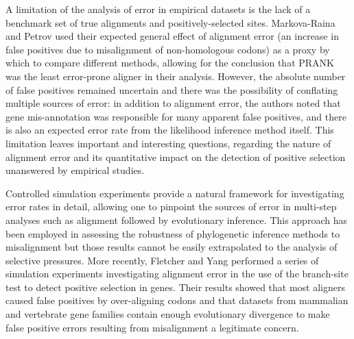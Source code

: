 \documentclass{article}
\begin{document}
A limitation of the analysis of error in empirical datasets is the
lack of a benchmark set of true alignments and positively-selected
sites. Markova-Raina and Petrov \citeyearpar{Markova-Raina2011High}
used their expected general effect of alignment error (an increase in
false positives due to misalignment of non-homologous codons) as a
proxy by which to compare different methods, allowing for the
conclusion that PRANK was the least error-prone aligner in their
analysis. However, the absolute number of false positives remained
uncertain and there was the possibility of conflating multiple sources
of error: in addition to alignment error, the authors noted that gene
mis-annotation was responsible for many apparent false positives, and
there is also an expected error rate from the likelihood inference
method itself. This limitation leaves important and interesting
questions, regarding the nature of alignment error and its
quantitative impact on the detection of positive selection unanswered
by empirical studies.

Controlled simulation experiments provide a natural framework for
investigating error rates in detail, allowing one to pinpoint the
sources of error in multi-step analyses such as alignment followed by
evolutionary inference. This approach has been employed in assessing
the robustness of phylogenetic inference methods to misalignment
\citep{Dwivedi2009Phylogenetic,Ogden2006Multiple,Loytynoja2008PhylogenyAware}
but those results cannot be easily extrapolated to the analysis of \sw
selective pressures. More recently, Fletcher and Yang
\citeyearpar{Fletcher2010Effect} performed a series of simulation
experiments investigating alignment error in the use of the
branch-site test to detect positive selection in genes. Their results
showed that most aligners caused false positives by over-aligning
codons and that datasets from mammalian and vertebrate gene families
contain enough evolutionary divergence to make false positive errors
resulting from misalignment a legitimate concern.
\end{document}

